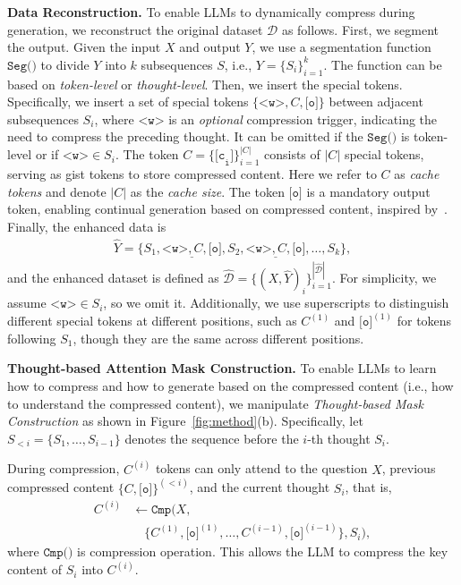 \textbf{Data Reconstruction.}
To enable LLMs to dynamically compress during generation, we reconstruct the original dataset $\mathcal{D}$ as follows.
First, we segment the output.
Given the input $X$ and output $Y$, we use a segmentation function $\texttt{Seg()}$ to divide $Y$ into $k$ subsequences $S$, i.e., $Y=\{S_i\}_{i=1}^{k}$.
The function can be based on \textit{token-level} or \textit{thought-level}.
Then, we insert the special tokens.
Specifically, we insert a set of special tokens $\{\texttt{<w>}, C, \texttt{[o]}\}$ between adjacent subsequences $S_i$, where $\texttt{<w>}$ is an \textit{optional} compression trigger, indicating the need to compress the preceding thought.
It can be omitted if the $\texttt{Seg()}$ is token-level or if $\texttt{<w>}\in S_i$.
The token $C=\{\texttt{[c}_\texttt{i}\texttt{]}\}_{i=1}^{|C|}$ consists of $|C|$ special tokens, serving as gist tokens to store compressed content. 
Here we refer to $C$ as \textit{cache tokens} and denote $|C|$ as the \textit{cache size}.
The token $\texttt{[o]}$ is a mandatory output token, enabling continual generation based on compressed content, inspired by~\citeauthor{emnlp24_onegen}.
Finally, the enhanced data is 
\begin{align*}
\hat{Y}=\{S_1, \underline{\texttt{<w>}, C, \texttt{[o]}}, S_2, \underline{\texttt{<w>}, C, \texttt{[o]}}, \dots, S_k\},
\end{align*}
and the enhanced dataset is defined as $\hat{\mathcal{D}}=\{(X,\hat{Y})_i\}_{i=1}^{|\hat{\mathcal{D}}|}$.
For simplicity, we assume $\texttt{<w>}\in S_i$, so we omit it. 
Additionally, we use superscripts to distinguish different special tokens at different positions, such as $C^{(1)}$ and $\texttt{[o]}^{(1)}$ for tokens following $S_1$, though they are the same across different positions.

\textbf{Thought-based Attention Mask Construction.}
To enable LLMs to learn how to compress and how to generate based on the compressed content (i.e., how to understand the compressed content), we manipulate \textit{Thought-based Mask Construction} as shown in Figure~\ref{fig:method}(b).
Specifically, let $S_{<i}=\{S_1,\dots,S_{i-1}\}$ denotes the sequence before the $i$-th thought $S_i$.

During compression, $C^{(i)}$ tokens can only attend to the question $X$, previous compressed content $\{{C,\texttt{[o]}\}}^{(<i)}$, and the current thought $S_i$, that is, 
\begin{align*}
C^{(i)} &\leftarrow \texttt{Cmp}(X, \\
&\quad \{C^{(1)}, \texttt{[o]}^{(1)}, \dots, C^{(i-1)}, \texttt{[o]}^{(i-1)}\}, S_i),
\end{align*}
where $\texttt{Cmp()}$ is compression operation.
This allows the LLM to compress the key content of $S_i$ into $C^{(i)}$.

